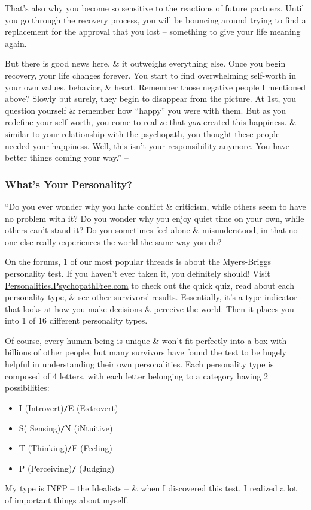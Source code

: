 \documentclass{article}
\numberwithin{equation}{section}
\begin{document}
That's also why you become so sensitive to the reactions of future partners. Until you go through the recovery process, you will be bouncing around trying to find a replacement for the approval that you lost -- something to give your life meaning again.

But there is good news here, \& it outweighs everything else. Once you begin recovery, your life changes forever. You start to find overwhelming self-worth in your own values, behavior, \& heart. Remember those negative people I mentioned above? Slowly but surely, they begin to disappear from the picture. At 1st, you question yourself \& remember how ``happy'' you were with them. But as you redefine your self-worth, you come to realize that \textit{you} created this happiness. \& similar to your relationship with the psychopath, you thought these people needed your happiness. Well, this isn't your responsibility anymore. You have better things coming your way.'' -- \cite[pp. 150--154]{MacKenzie2015}

\subsubsection{What's Your Personality?}
``Do you ever wonder why you hate conflict \& criticism, while others seem to have no problem with it? Do you wonder why you enjoy quiet time on your own, while others can't stand it? Do you sometimes feel alone \& misunderstood, in that no one else really experiences the world the same way you do?

On the forums, 1 of our most popular threads is about the Myers-Briggs personality test. If you haven't ever taken it, you definitely should! Visit \url{Personalities.PsychopathFree.com} to check out the quick quiz, read about each personality type, \& see other survivors' results. Essentially, it's a type indicator that looks at how you make decisions \& perceive the world. Then it places you into 1 of 16 different personality types.

Of course, every human being is unique \& won't fit perfectly into a box with billions of other people, but many survivors have found the test to be hugely helpful in understanding their own personalities. Each personality type is composed of 4 letters, with each letter belonging to a category having 2 possibilities:
\begin{itemize}
	\item I (Introvert){\tt/}E (Extrovert)
	\item S( Sensing){\tt/}N (iNtuitive)
	\item T (Thinking){\tt/}F (Feeling)
	\item P (Perceiving){\tt/} (Judging)
\end{itemize}
My type is INFP -- the Idealists -- \& when I discovered this test, I realized a lot of important things about myself.
\end{document}

